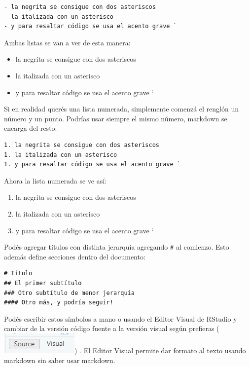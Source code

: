 \documentclass[
  letterpaper,
  DIV=11,
  numbers=noendperiod]{scrartcl}
\providecommand{\tightlist}{%
  \setlength{\itemsep}{0pt}\setlength{\parskip}{0pt}}\usepackage{longtable,booktabs,array}
\begin{document}
\begin{verbatim}
- la negrita se consigue con dos asteriscos
- la italizada con un asterisco
- y para resaltar código se usa el acento grave `
\end{verbatim}

Ambas listas se van a ver de esta manera:

\begin{itemize}
\tightlist
\item
  la negrita se consigue con dos asteriscos
\item
  la italizada con un asterisco
\item
  y para resaltar código se usa el acento grave `
\end{itemize}

Si en realidad querés una lista numerada, simplemente comenzá el renglón
un número y un punto. Podrías usar siempre el mismo número, markdown se
encarga del resto:

\begin{verbatim}
1. la negrita se consigue con dos asteriscos
1. la italizada con un asterisco
1. y para resaltar código se usa el acento grave `
\end{verbatim}

Ahora la lista numerada se ve así:

\begin{enumerate}
\def\labelenumi{\arabic{enumi}.}
\tightlist
\item
  la negrita se consigue con dos asteriscos
\item
  la italizada con un asterisco
\item
  y para resaltar código se usa el acento grave `
\end{enumerate}

Podés agregar títulos con distinta jerarquía agregando \texttt{\#} al
comienzo. Esto además define secciones dentro del documento:

\begin{verbatim}
# Título
## El primer subtítulo
### Otro subtítulo de menor jerarquía
#### Otro más, y podría seguir!
\end{verbatim}

Podés escribir estos símbolos a mano o usando el Editor Visual de
RStudio y cambiar de la versión código fuente a la versión visual según
prefieras (\includegraphics{img/icono-editor-visual.png}) . El Editor
Visual permite dar formato al texto usando markdown sin saber usar
markdown.
\end{document}
